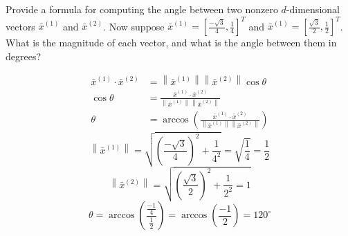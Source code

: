 \documentclass[12pt, letterpaper]{article}
\begin{document}
\color{\TextColor}
\pagecolor{\colormode}
\setlength{\parindent}{0pt}
\pagestyle{fancy}
\fancyhf{}
\fancyhead[ROE]{\color{\TextColor}\jobname --- \thepage}

\begin{subproblem}{}
    Provide a formula for computing the angle between two nonzero $d$-dimensional vectors $\bar{x}^{(1)}$ and $\bar{x}^{(2)}$. 
    Now suppose $\bar{x}^{(1)}= [\frac{-\sqrt{3}}{4},\frac{1}{4}]^T$ and $\bar{x}^{(1)}= [\frac{\sqrt{3}}{2},\frac{1}{2}]^T$. What is the magnitude of each vector, and what is the angle between them in degrees?
\end{subproblem}
\begin{solution}
    \begin{align*}
        \bar{x}^{(1)} \cdot \bar{x}^{(2)} 
        &= \left\| \bar{x}^{(1)} \right\|\left\|\bar{x}^{(2)}\right\| \cos{\theta}\\
        \cos{\theta} &= \frac{\bar{x}^{(1)} \cdot \bar{x}^{(2)} }{\left\| \bar{x}^{(1)} \right\|\left\|\bar{x}^{(2)}\right\|}\\
        \theta &= \arccos \left( \frac{\bar{x}^{(1)} \cdot \bar{x}^{(2)} }{\left\| \bar{x}^{(1)} \right\|\left\|\bar{x}^{(2)}\right\|} \right)
    \end{align*}
    \[\left\|\bar{x}^{(1)}\right\|=\sqrt{\left( \frac{-\sqrt{3}}{4} \right)^2 + \frac{1}{4^2}} = \sqrt{\frac{1}{4}}=\frac{1}{2}\]
    \[\left\|\bar{x}^{(2)}\right\|=\sqrt{\left( \frac{\sqrt{3}}{2} \right)^2 + \frac{1}{2^2}=1}\]
    \[\theta=\arccos\left( \frac{\frac{-1}{4}}{\frac{1}{2}} \right)
    =\arccos\left(  \frac{-1}{2}\right)=120^\circ\]
\end{solution}
\end{document}
